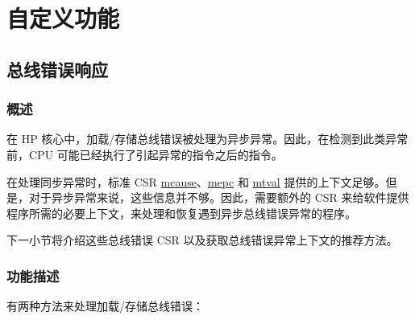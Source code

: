 \documentclass[main\_\_CN.tex]{subfiles}
\begin{document}
\section{自定义功能}


\subsection{总线错误响应}
\label{sec:riscvcpu-bus-err-resp}
\subsubsection{概述}
\label{sec:riscvcpu-buserr-overview}

在 HP 核心中，加载/存储总线错误被处理为异步异常。因此，在检测到此类异常前，CPU 可能已经执行了引起异常的指令之后的指令。

在处理同步异常时，标准 CSR \hyperref[regdesc:MCAUSE]{mcause}、\hyperref[regdesc:MEPC]{mepc} 和 \hyperref[regdesc:MTVAL]{mtval} 提供的上下文足够。但是，对于异步异常来说，这些信息并不够。因此，需要额外的 CSR 来给软件提供程序所需的必要上下文，来处理和恢复遇到异步总线错误异常的程序。

下一小节将介绍这些总线错误 CSR 以及获取总线错误异常上下文的推荐方法。

\subsubsection{功能描述}
\label{sec:riscvcpu-buserr-func-descr}

有两种方法来处理加载/存储总线错误：
\end{document}
